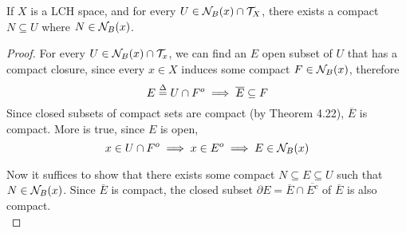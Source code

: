 \documentclass[../../main.tex]{subfiles}
\begin{document}
\begin{wts}
    If $X$ is a LCH space, and for every $U\in\mathcal{N}_B({x})\cap\mathcal{T}_X$, there exists a compact $N\subseteq U$ where $N\in\mathcal{N}_B({x})$.
\end{wts}
\renewcommand{\oe}{\overline{E}}
\begin{proof}
    For every $U\in \mathcal{N}_B({x})\cap\mathcal{T}_x$, we can find an $E$ open subset of $U$ that has a compact closure, since every $x\in X$ induces some compact $F\in\mathcal{N}_B({x})$, therefore
    \[
    E\overset{\Delta}{=} U\cap F^o\implies \overline{E}\subseteq F
    \]
    Since closed subsets of compact sets are compact (by Theorem 4.22), $\overline{E}$ is compact. More is true, since $E$ is open,
    \[
    x\in U\cap F^o\implies x\in E^o\implies E\in\mathcal{N}_B({x})
    \]
    
    
    
    Now it suffices to show that there exists some compact $N\subseteq E\subseteq U$ such that $N\in\mathcal{N}_B({x})$. Since $\oe$ is compact, the closed subset $\partial E = \oe\cap\overline{E^c}$ of $\oe$ is also compact.\\
    

\end{proof}
\end{document}
